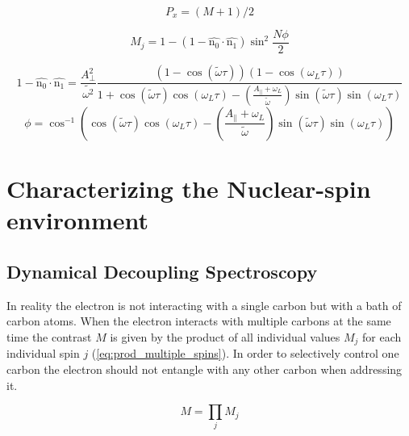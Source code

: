 \begin{equation}
\label{eq:contrast_to_probability}
P_x = (M+1)/2
\end{equation}

\begin{equation}
\label{eq:contrast_single_carbon_spin}
M_j = 1-(1 - \hat{\bm{\mathrm{n_0}}} \cdot \hat{\bm{\mathrm{n_1}}}) \sin^2 \frac{N\phi}{2}
\end{equation}

\begin{equation}
\label{eq:vec_term}
    1 - \hat{\bm{\mathrm{n_0}}} \cdot \hat{\bm{\mathrm{n_1}}} =  \frac{A_\perp ^2}{\tilde{\omega^2}} \frac{(1- \cos{(\tilde{\omega} \tau)})(1-\cos{(\omega_L \tau)})} {1 +\cos{(\tilde{\omega} \tau)}\cos{(\omega_L \tau)} - (\frac{ A_ \parallel + \omega_L }{ \tilde{ \omega}}) \sin{(\tilde{\omega} \tau)}\sin{(\omega_L \tau)}}
\end{equation}
\begin{equation}
\label{eq:angle_term}
    \phi =  \cos^{-1}\left(\cos(\tilde{\omega} \tau) \cos(\omega_L \tau)-\left(\frac{ A_ \parallel + \omega_L }{ \tilde{ \omega}}\right) \sin(\tilde{\omega} \tau)\sin(\omega_L \tau)\right)
\end{equation}

\section{Characterizing the Nuclear-spin environment}
\subsection*{Dynamical Decoupling Spectroscopy}
In reality the electron is not interacting with a single carbon but with a bath of carbon atoms. When the electron interacts with multiple carbons at the same time the contrast $M$ is given by the product of all individual values $M_j$ for each individual spin $j$ (\cref{eq:prod_multiple_spins}). In order to selectively control one carbon the electron should not entangle with any other carbon when addressing it.

\begin{equation}
\label{eq:prod_multiple_spins}
    M = \prod_{j}{M_j}
\end{equation}

